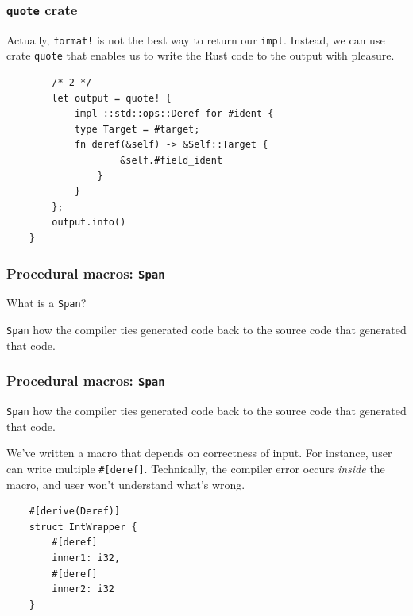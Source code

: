 \documentclass[aspectratio=1610,t]{beamer}
\begin{document}

\begin{frame}[fragile]
\frametitle{\texttt{quote} crate}
Actually, \texttt{format!} is not the best way to return our \texttt{impl}. Instead, we can use crate \texttt{quote} that enables us to write the Rust code to the output with pleasure.

\begin{verbatim}
        /* 2 */
        let output = quote! {
            impl ::std::ops::Deref for #ident {
            type Target = #target;
            fn deref(&self) -> &Self::Target {
                    &self.#field_ident
                }
            }
        };
        output.into()
    }
\end{verbatim}
\end{frame}


\begin{frame}[fragile]
\frametitle{Procedural macros: \texttt{Span}}
What is a \texttt{Span}?

\texttt{Span} how the compiler ties generated code back to the source code that generated that code.
\end{frame}


\begin{frame}[fragile]
\frametitle{Procedural macros: \texttt{Span}}
\texttt{Span} how the compiler ties generated code back to the source code that generated that code.

We've written a macro that depends on correctness of input. For instance, user can write multiple \texttt{\#[deref]}. Technically, the compiler error occurs \textit{inside} the macro, and user won't understand what's wrong.

\begin{verbatim}
    #[derive(Deref)]
    struct IntWrapper {
        #[deref]
        inner1: i32,
        #[deref]
        inner2: i32
    }
\end{verbatim}

\end{frame}

\end{document}

